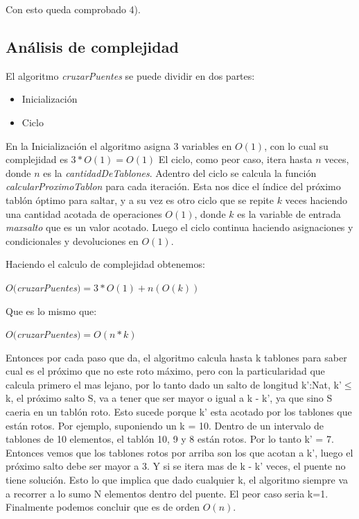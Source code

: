 Con esto queda comprobado 4).
\\
\subsection{An\'alisis de complejidad}
El algoritmo \textit{cruzarPuentes} se puede dividir en dos partes:
\begin{itemize}
\item Inicialización
\item Ciclo
\end{itemize}

En la Inicialización el algoritmo asigna 3 variables en $O(1)$, con lo cual su complejidad es $3*O(1) = O(1)$
El ciclo, como peor caso, itera hasta $n$ veces, donde $n$ es la \textit{cantidadDeTablones}. Adentro del ciclo se calcula la función \textit{calcularProximoTablon} para cada iteración. Esta nos dice el índice del próximo tablón óptimo para saltar, y a su vez es otro ciclo que se repite $k$ veces haciendo una cantidad acotada de operaciones $O(1)$, donde $k$ es la variable de entrada \textit{maxsalto} que es un valor acotado.
Luego el ciclo continua haciendo asignaciones y condicionales y devoluciones en $O(1)$.

Haciendo el calculo de complejidad obtenemos:

$O($\textit{cruzarPuentes}$) = 3*O(1) + n(O(k))$

Que es lo mismo que:

$O($\textit{cruzarPuentes}$) = O(n*k)$


\label{an}
Entonces por cada paso que da, el algoritmo calcula hasta k tablones para saber cual es el pr\'oximo que no este roto m\'aximo, pero con la particularidad que calcula primero el mas lejano, por lo tanto dado un salto de longitud k':Nat, k'$\leq$ k, el pr\'oximo salto S, va a tener que ser mayor o igual a k - k', ya que sino S caeria en un tabl\'on roto.
Esto sucede porque k' esta acotado por los tablones que est\'an rotos.
Por ejemplo, suponiendo un k = 10. Dentro de un intervalo de tablones de 10 elementos, el tabl\'on 10, 9 y 8 est\'an rotos. Por lo tanto k' = 7. Entonces vemos que los tablones rotos por arriba son los que acotan a k', luego el pr\'oximo salto debe ser mayor a 3. Y si se itera mas de k - k' veces, el puente no tiene soluci\'on.
Esto lo que implica que dado cualquier k, el algoritmo siempre va a recorrer a lo sumo N elementos dentro del puente. El peor caso seria k=1.
Finalmente podemos concluir que es de orden $O(n)$.


